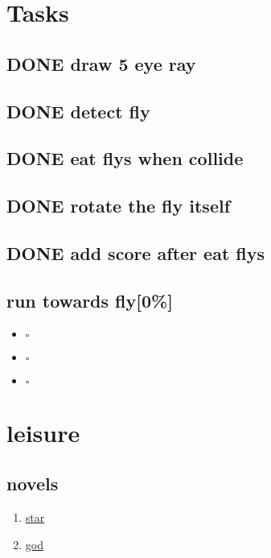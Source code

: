 \documentclass[11pt]{article}
\begin{document}
\section{Tasks}
\label{sec-2}

\subsection{{\bfseries\sffamily DONE} draw 5 eye ray}
\label{sec-2-1}

\subsection{{\bfseries\sffamily DONE} detect fly}
\label{sec-2-2}

\subsection{{\bfseries\sffamily DONE} eat flys when collide}
\label{sec-2-3}

\subsection{{\bfseries\sffamily DONE} rotate the fly itself}
\label{sec-2-4}
\subsection{{\bfseries\sffamily DONE} add score after eat flys}
\label{sec-2-5}
\subsection{run towards fly[0\%]}
\label{sec-2-6}
\begin{itemize}
\item $\square$ 
\item $\square$ 
\item $\square$ 
\end{itemize}



\section{leisure}
\label{sec-3}
\subsection{novels}
\label{sec-3-1}
\begin{enumerate}
\item \href{http://www.93hhxs.org/sj0/}{star}
\item \href{http://www.boxuexs.org/wqz/}{god}
\end{enumerate}
\end{document}
